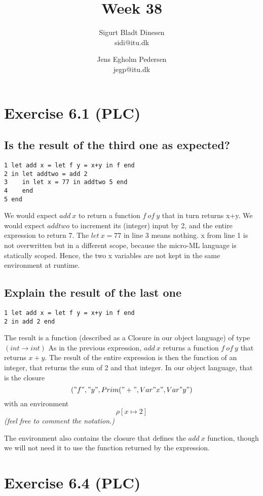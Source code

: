 \documentclass[a4paper]{article}
\begin{document}
\title{Week 38}
\author{Sigurt Bladt Dinesen \\sidi{@}itu.dk \and Jens Egholm Pedersen \\jegp{@}itu.dk}
\maketitle
\pagebreak
\section*{Exercise 6.1 (PLC)}
\subsection*{Is the result of the third one as expected?}
\begin{verbatim}
1 let add x = let f y = x+y in f end
2 in let addtwo = add 2
3    in let x = 77 in addtwo 5 end
4    end
5 end
\end{verbatim}
We would expect $add\ x$ to return a function $f\ of\ y$ that in turn returns x+y.
We would expect $addtwo$ to increment its (integer) input by 2, and the entire expression
to return 7.
The $let\ x = 77$ in line 3 means nothing. x from line 1 is not overwritten but
in a different scope, because the micro-ML language is statically scoped. Hence,
the two x variables are not kept in the same environment at runtime.


\subsection*{Explain the result of the last one}
\begin{verbatim}
1 let add x = let f y = x+y in f end
2 in add 2 end
\end{verbatim}
The result is a function (described as a Closure in our object language) of
type $(int \to int)$ As in the previous expression, $add\ x$ returns a function
$f\ of\ y$ that returns $x+y$. The result of the entire expression is then the
function of an integer, that returns the sum of 2 and that integer.
In our object language, that is the closure
$$("f","y", Prim("+", Var "x", Var "y")$$
with an environment $$\rho [x \mapsto 2]$$
\textit{\small{(feel free to comment the notation.)}}

The environment also contains the closure that defines the $add\ x$ function,
though we will not need it to use the function returned by the expression.

\section*{Exercise 6.4 (PLC)}
\end{document}
